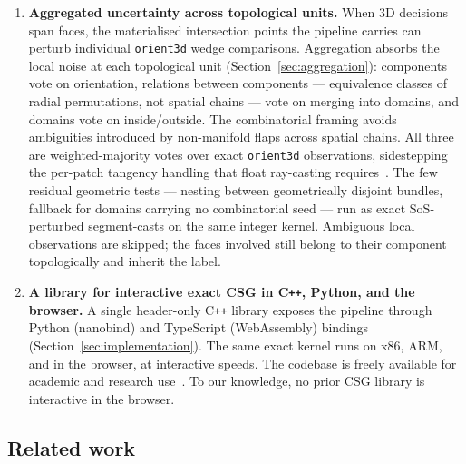 \documentclass{egpubl}
\begin{document}
\begin{enumerate}
\item \textbf{Aggregated uncertainty across topological units.}
When 3D decisions span faces, the materialised intersection points the pipeline carries can perturb individual \texttt{orient3d} wedge comparisons. Aggregation absorbs the local noise at each topological unit (Section~\ref{sec:aggregation}): components vote on orientation, relations between components --- equivalence classes of radial permutations, not spatial chains --- vote on merging into domains, and domains vote on inside/outside. The combinatorial framing avoids ambiguities introduced by non-manifold flaps across spatial chains. All three are weighted-majority votes over exact \texttt{orient3d} observations, sidestepping the per-patch tangency handling that float ray-casting requires~\cite{Cherchi2022}. The few residual geometric tests --- nesting between geometrically disjoint bundles, fallback for domains carrying no combinatorial seed --- run as exact SoS-perturbed segment-casts on the same integer kernel. Ambiguous local observations are skipped; the faces involved still belong to their component topologically and inherit the label.

\item \textbf{A library for interactive exact CSG in C\texttt{++}, Python, and the browser.}
A single header-only C\texttt{++} library exposes the pipeline through Python (nanobind) and TypeScript (WebAssembly) bindings (Section~\ref{sec:implementation}). The same exact kernel runs on x86, ARM, and in the browser, at interactive speeds. The codebase is freely available for academic and research use~\cite{trueform2025}. To our knowledge, no prior CSG library is interactive in the browser.
\end{enumerate}

\subsection{Related work}
\label{sec:related}
\end{document}
